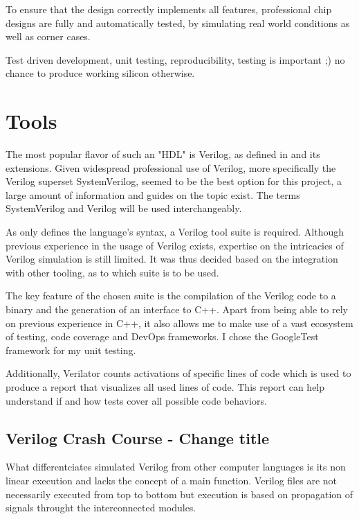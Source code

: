 To ensure that the design correctly implements all features, professional chip designs are fully and automatically tested, by simulating real world conditions as well as corner cases. 



Test driven development, unit testing, reproducibility, testing is important ;) no chance to produce working silicon otherwise.

\section{Tools}

The most popular flavor of such an "HDL" is Verilog, as defined in \cite{10458102} and its extensions. Given widespread professional use of Verilog, more specifically the Verilog superset SystemVerilog, seemed to be the best option for this project, a large amount of information and guides on the topic exist. The terms SystemVerilog and Verilog will be used interchangeably. 

As \cite{10458102} only defines the language's syntax, a Verilog tool suite is required. Although previous experience in the usage of Verilog exists, expertise on the intricacies of Verilog simulation is still limited. It was thus decided based on the integration with other tooling, as to which suite is to be used. 

The key feature of the chosen suite is the compilation of the Verilog code to a binary and the generation of an interface to C++. Apart from being able to rely on previous experience in C++, it also allows me to make use of a vast ecosystem of testing, code coverage and DevOps frameworks. I chose the GoogleTest framework for my unit testing. 

Additionally, Verilator counts activations of specific lines of code which is used to produce a report that visualizes all used lines of code. This report can help understand if and how tests cover all possible code behaviors. 

\subsection{Verilog Crash Course - Change title}
What differentciates simulated Verilog from other computer languages is its non linear execution and lacks the concept of a main function. Verilog files are not necessarily executed from top to bottom but execution is based on propagation of signals throught the interconnected modules. 

